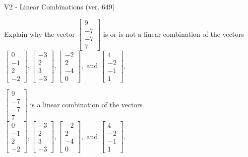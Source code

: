 \begin{exercise}
  \begin{exerciseTitle}V2 - Linear Combinations (ver. 649)\end{exerciseTitle}
  \begin{exerciseStatement}
    Explain why the vector \(\left[\begin{array}{c}
9 \\
-7 \\
-7 \\
7
\end{array}\right]\)  is or is not a linear 
	combination of the vectors \(\left[\begin{array}{c}
0 \\
-1 \\
2 \\
-2
\end{array}\right] , \left[\begin{array}{c}
-3 \\
2 \\
3 \\
-3
\end{array}\right] , \left[\begin{array}{c}
-2 \\
2 \\
-4 \\
0
\end{array}\right] , \text{ and } \left[\begin{array}{c}
4 \\
-2 \\
-1 \\
1
\end{array}\right]\).
	


  \end{exerciseStatement}
  \begin{exerciseAnswer}
   \(\left[\begin{array}{c}
9 \\
-7 \\
-7 \\
7
\end{array}\right]\) 
  	 is  
	a linear combination of the vectors \(\left[\begin{array}{c}
0 \\
-1 \\
2 \\
-2
\end{array}\right] , \left[\begin{array}{c}
-3 \\
2 \\
3 \\
-3
\end{array}\right] , \left[\begin{array}{c}
-2 \\
2 \\
-4 \\
0
\end{array}\right] , \text{ and } \left[\begin{array}{c}
4 \\
-2 \\
-1 \\
1
\end{array}\right]\).


\end{exerciseAnswer}
\end{exercise}
